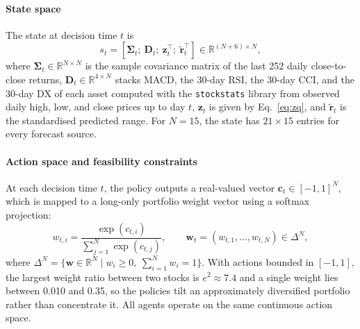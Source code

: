 \documentclass[pdflatex,sn-mathphys-num]{sn-jnl}%
\theoremstyle{thmstyleone}%
\theoremstyle{thmstyletwo}%
\theoremstyle{thmstylethree}%
\begin{document}
\paragraph{State space}
{\color{blue}The state at decision time $t$ is
\begin{equation}
s_t=\left[\boldsymbol{\Sigma}_{t};\ \mathbf{D}_{t};\ \mathbf{z}_{t}^{\top};\ \tilde{\mathbf{r}}_{t}^{\top}\right]\in\mathbb{R}^{(N+6)\times N},
\label{eq:state}
\end{equation}
where $\boldsymbol{\Sigma}_{t}\in\mathbb{R}^{N\times N}$ is the sample covariance matrix of the last 252 daily close-to-close returns, $\mathbf{D}_{t}\in\mathbb{R}^{4\times N}$ stacks MACD, the 30-day RSI, the 30-day CCI, and the 30-day DX of each asset computed with the \texttt{stockstats} library from observed daily high, low, and close prices up to day $t$, $\mathbf{z}_t$ is given by Eq.~\eqref{eq:zq}, and $\tilde{\mathbf{r}}_t$ is the standardised predicted range. For $N=15$, the state has $21\times15$ entries for every forecast source.\par}

\paragraph{Action space and feasibility constraints}
At each decision time $t$, the policy outputs a real-valued vector $\mathbf{c}_{t}\in[-1,1]^{N}$, which is mapped to a long-only portfolio weight vector using a softmax projection:
\begin{equation}
w_{t,i}=\frac{\exp(c_{t,i})}{\sum_{j=1}^{N}\exp(c_{t,j})},\qquad
\mathbf{w}_{t}=(w_{t,1},\ldots,w_{t,N})\in\Delta^{N},
\label{eq:portfolio_softmax}
\end{equation}
where $\Delta^{N}=\{\mathbf{w}\in\mathbb{R}^{N}\mid w_i\ge 0,\ \sum_{i=1}^{N}w_i=1\}$. {\color{blue}With actions bounded in $[-1,1]$, the largest weight ratio between two stocks is $e^{2}\approx7.4$ and a single weight lies between 0.010 and 0.35, so the policies tilt an approximately diversified portfolio rather than concentrate it.} All agents operate on the same continuous action space.
\end{document}

